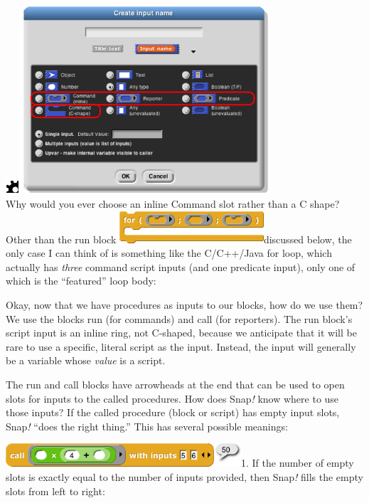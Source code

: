 \includegraphics[width=0.19792in,height=0.19792in]{media/image658.png}\includegraphics[width=3.65278in,height=2.75455in]{media/image709.png}\\
Why would you ever choose an inline Command slot rather than a C shape?
Other than the run block
\includegraphics[width=2.11458in,height=0.46875in]{media/image710.png}discussed
below, the only case I can think of is something like the C/C++/Java for
loop, which actually has \emph{three} command script inputs (and one
predicate input), only one of which is the ``featured'' loop body:

Okay, now that we have procedures as inputs to our blocks, how do we use
them? We use the blocks run (for commands) and call (for reporters). The
run block's script input is an inline ring, not C-shaped, because we
anticipate that it will be rare to use a specific, literal script as the
input. Instead, the input will generally be a variable whose
\emph{value} is a script.

The run and call blocks have arrowheads at the end that can be used to
open slots for inputs to the called procedures. How does Snap\emph{!}
know where to use those inputs? If the called procedure (block or
script) has empty input slots, Snap\emph{!} ``does the right thing.''
This has several possible meanings:

\includegraphics[width=3.44792in,height=0.34406in]{media/image711.png}1.
If the number of empty slots is exactly equal to the number of inputs
provided, then Snap\emph{!} fills the empty slots from left to right:

